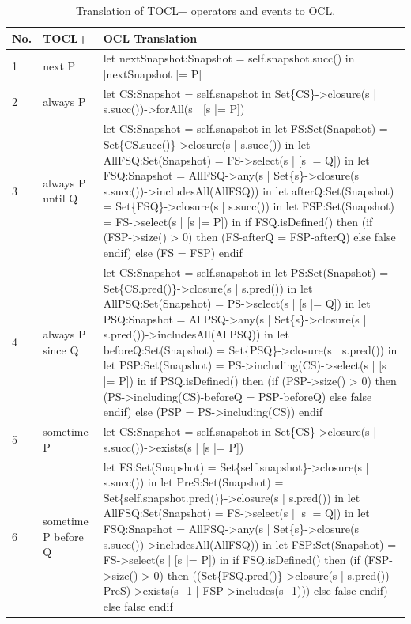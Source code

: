 \begin{table}[htbp]
\caption{Translation of TOCL+ operators and events to OCL.}
\label{tab:TOCL2OCL}
\begin{tabularx}{\textwidth}{|>{\footnotesize}p{0.6cm}|>{\scriptsize\raggedright\arraybackslash}p{4cm}|>{\scriptsize\raggedright\arraybackslash}X|}
    \hline
    \textbf{No.} & \textbf{TOCL+} & \textbf{OCL Translation} \\
    \hline
    1 & 
    next P &
    let nextSnapshot:Snapshot = self.snapshot.succ() in [nextSnapshot |= P] \\
    \hline
    2 &
    always P &
    let CS:Snapshot = self.snapshot in Set\{CS\}->closure(s | s.succ())->forAll(s | [s |= P]) \\
    \hline  
    3 &
    always P until Q &
    let CS:Snapshot = self.snapshot
    in let FS:Set(Snapshot) = Set\{CS.succ()\}->closure(s | s.succ())
    in let AllFSQ:Set(Snapshot) = FS->select(s | [s |= Q])
    in let FSQ:Snapshot = AllFSQ->any(s | Set\{s\}->closure(s | s.succ())->includesAll(AllFSQ))
    in let afterQ:Set(Snapshot) = Set\{FSQ\}->closure(s | s.succ())
    in let FSP:Set(Snapshot) = FS->select(s | [s |= P])
    in if FSQ.isDefined() then (if (FSP->size() > 0) then (FS-afterQ = FSP-afterQ) else false endif) else (FS = FSP) endif \\
    \hline
    4 &
    always P since Q &
    let CS:Snapshot = self.snapshot
    in let PS:Set(Snapshot) = Set\{CS.pred()\}->closure(s | s.pred())
    in let AllPSQ:Set(Snapshot) = PS->select(s | [s |= Q])
    in let PSQ:Snapshot = AllPSQ->any(s | Set\{s\}->closure(s | s.pred())->includesAll(AllPSQ))
    in let beforeQ:Set(Snapshot) = Set\{PSQ\}->closure(s | s.pred())
    in let PSP:Set(Snapshot) = PS->including(CS)->select(s | [s |= P])
    in if PSQ.isDefined() then (if (PSP->size() > 0) then (PS->including(CS)-beforeQ = PSP-beforeQ) else false endif) else (PSP = PS->including(CS)) endif \\
    \hline
    5 &
    sometime P &
    let CS:Snapshot = self.snapshot in Set\{CS\}->closure(s | s.succ())->exists(s | [s |= P]) \\
    \hline
    6 &
    sometime P before Q &
    let FS:Set(Snapshot) = Set\{self.snapshot\}->closure(s | s.succ())
    in let PreS:Set(Snapshot) = Set\{self.snapshot.pred()\}->closure(s | s.pred())
    in let AllFSQ:Set(Snapshot) = FS->select(s | [s |= Q])
    in let FSQ:Snapshot = AllFSQ->any(s | Set\{s\}->closure(s | s.succ())->includesAll(AllFSQ))
    in let FSP:Set(Snapshot) = FS->select(s | [s |= P])
    in if FSQ.isDefined() then (if (FSP->size() > 0) then ((Set\{FSQ.pred()\}->closure(s | s.pred())-PreS)->exists(s\_1 | FSP->includes(s\_1))) else false endif) else false endif \\

\end{tabularx}
\end{table}
